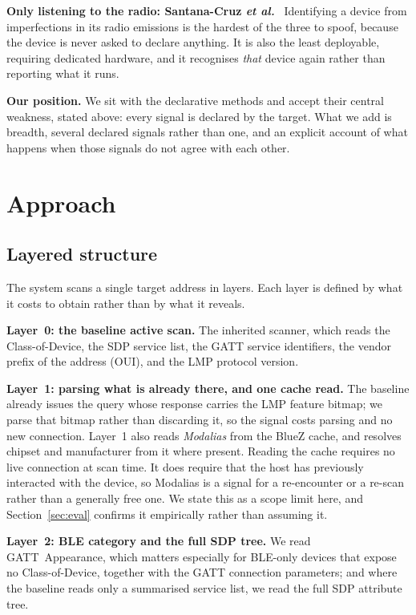 \documentclass[conference]{IEEEtran}
\begin{document}
\textbf{Only listening to the radio: Santana-Cruz \emph{et al.}}~\cite{santanacruz2024jsdivergence}
Identifying a device from imperfections in its radio emissions is the
hardest of the three to spoof, because the device is never asked to declare
anything. It is also the least deployable, requiring dedicated hardware, and
it recognises \emph{that} device again rather than reporting what it runs.

\textbf{Our position.} We sit with the declarative methods and accept their
central weakness, stated above: every signal is declared by the target. What
we add is breadth, several declared signals rather than one, and an explicit
account of what happens when those signals do not agree with each other.

\section{Approach}\label{sec:approach}
\subsection{Layered structure}\label{sec:layers}
The system scans a single target address in layers. Each layer is defined by
what it costs to obtain rather than by what it reveals.

\textbf{Layer~0: the baseline active scan.} The inherited scanner, which reads
the Class-of-Device, the SDP service list, the GATT service identifiers, the
vendor prefix of the address (OUI), and the LMP protocol version.

\textbf{Layer~1: parsing what is already there, and one cache read.} The
baseline already issues the query whose response carries the LMP feature
bitmap; we parse that bitmap rather than discarding it, so the signal costs
parsing and no new connection. Layer~1 also reads \emph{Modalias} from the
BlueZ cache, and resolves chipset and manufacturer from it where present.
Reading the cache requires no live connection at scan time. It does require
that the host has previously interacted with the device, so Modalias is a
signal for a re-encounter or a re-scan rather than a generally free one. We
state this as a scope limit here, and Section~\ref{sec:eval} confirms it
empirically rather than assuming it.

\textbf{Layer~2: BLE category and the full SDP tree.} We read
GATT~Appearance, which matters especially for BLE-only devices that expose no
Class-of-Device, together with the GATT connection parameters; and where the
baseline reads only a summarised service list, we read the full SDP attribute
tree.
\end{document}
